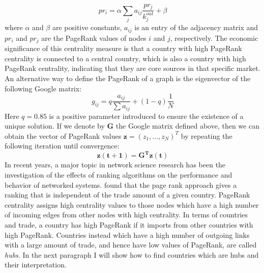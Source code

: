 \begin{equation}\label{eq:pagerank}
    pr_i = \alpha \sum_{j} a_{ij} \frac{pr_j}{k_j^{out}} + \beta
\end{equation}
where $\alpha$ and $\beta$ are positive constants, $a_{ij}$ is an entry of the adjacency matrix and $pr_i$ and $pr_j$ are the PageRank values of nodes $i$ and $j$, respectively. 
The economic significance of this centrality measure is that a country with high PageRank centrality is connected to a central country, which is also a country with high PageRank centrality, indicating that they are core sources in that specific market.
An alternative way to define the PageRank of a graph is the eigenvector of the following Google matrix:
\begin{equation}\label{eq:googlemat}
    g_{ij} = q \frac{a_{ij}}{\sum a_{ij}} + (1-q)\frac{1}{N}
\end{equation}
Here $q = 0.85$ is a positive parameter introduced to ensure the existence of a unique solution. If we denote by $\mathbf{G}$ the Google matrix defined above, then we can obtain the vector of PageRank values $\mathbf{z} = (z_1,\dots,z_N)^T$ by repeating the following iteration until convergence:
\begin{equation}
    \mathbf{z(t+1) = G^T z(t)}
\end{equation}
In recent years, a major topic in network science research has been the investigation of the effects of ranking algorithms on the performance and behavior of networked systems. \textcite{ermann2011google} found that the page rank approach gives a ranking that is independent of the trade amount of a given country.
PageRank centrality assigns high centrality values to those nodes which have a high number of incoming edges from other nodes with high centrality. In terms of countries and trade, a country has high PageRank if it imports from other countries with high PageRank. Countries instead which have a high number of outgoing links with a large amount of trade, and hence have low values of PageRank, are called \textit{hubs}. In the next paragraph I will show how to find countries which are hubs and their interpretation.

